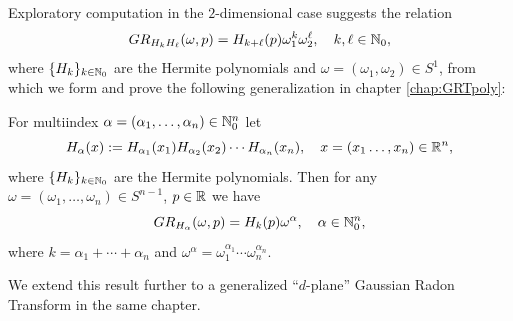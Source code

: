 Exploratory computation in the $2$-dimensional case suggests the relation
\[
  GR_{H_k H_\ell}(\omega, p) = H_{k + \ell}(p) \omega_1^k \omega_2^\ell, \quad k, \ell \in \mathbb{N}_0,
\]
where $\{H_k\}_{k \in \mathbb{N}_0}$ are the Hermite polynomials and $\omega = (\omega_1, \omega_2) \in S^1$, from which we form and prove the following generalization in chapter \ref{chap:GRTpoly}:
\begin{theorem}
  For multiindex $\alpha = (\alpha_1, \ldots, \alpha_n) \in \mathbb{N}_0^n$ let 
  \[
    H_\alpha(x) := H_{\alpha_1}(x_1) H_{\alpha_2}(x_2) \cdots H_{\alpha_n}(x_n),
    \quad x = (x_1 \ldots, x_n) \in \mathbb{R}^n,
  \] 
  where $\{H_k\}_{k \in \mathbb{N}_0}$ are the Hermite polynomials. Then for any $\omega = (\omega_1, \ldots, \omega_n) \in S^{n-1}$, $p \in \mathbb{R}$ we have
  \begin{equation}\label{eq:GRTH}
    GR_{H_\alpha}(\omega, p) = H_k(p)\omega^\alpha, \quad \alpha \in \mathbb{N}_0^n,
  \end{equation}
  where $k = \alpha_1 + \cdots + \alpha_n$ and $\omega^\alpha = \omega_1^{\alpha_1} \cdots \omega_n^{\alpha_n}$.
\end{theorem}

We extend this result further to a generalized ``$d$-plane'' Gaussian Radon Transform in the same chapter.


